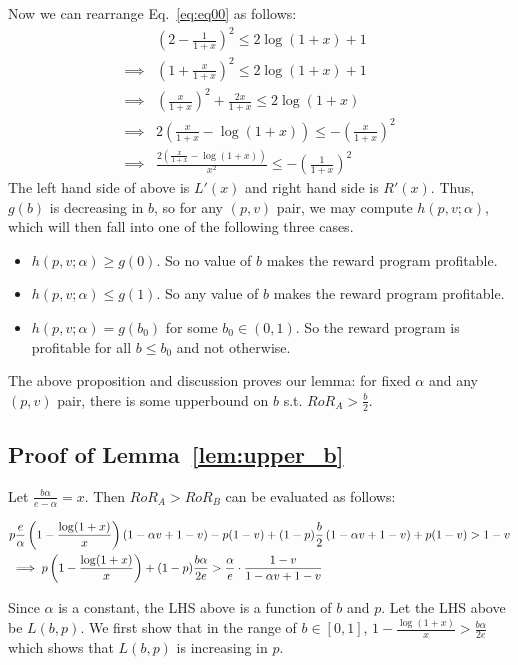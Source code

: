 Now we can rearrange Eq.~\ref{eq:eq00} as follows:
\begin{align*}
& \left(2-\frac{1}{1+x}\right)^2 \le 2\log(1+x) + 1\\
\implies & \left(1 + \frac{x}{1+x}\right)^2 \le 2\log(1+x) + 1\\
\implies & \left(\frac{x}{1+x}\right)^2 + \frac{2x}{1+x} \le 2\log(1+x)\\
\implies & 2\left(\frac{x}{1+x} - \log(1+x)\right) \le - \left(\frac{x}{1+x}\right)^2\\
\implies & \frac{2\left(\frac{x}{1+x} - \log(1+x)\right)}{x^2} \le - \left(\frac{1}{1+x}\right)^2
\end{align*}
The left hand side of above is $L'(x)$ and right hand side is $R'(x)$.
\endproof
Thus, $g(b)$ is decreasing in $b$, so for any $(p,v)$ pair, we may compute $h(p, v; \alpha)$, which will then fall into one of the following three cases.
\begin{itemize}
\item
$h(p,v;\alpha) \geq g(0)$. So no value of $b$ makes the reward program profitable.
\item
$h(p,v;\alpha) \leq g(1)$. So any value of $b$ makes the reward program profitable.
\item
$h(p,v;\alpha) = g(b_0)$ for some $b_0 \in (0,1)$. So the reward program is profitable for all $b \leq b_0$ and not otherwise.
\end{itemize}

The above proposition and discussion proves our lemma: for fixed $\alpha$ and any $(p,v)$ pair, there is some upperbound on $b$ s.t. $RoR_A > \frac{b}{2}$. 
\endproof

\subsection{Proof of Lemma~\ref{lem:upper_b}}
\proof
Let $\frac{b\alpha}{e-\alpha} = x$. Then $RoR_A > RoR_B$ can be evaluated as follows:

\begin{eqnarray}
& p\frac{e}{\alpha}\left(1-\frac{\log(1+x)}{x}\right)(1-\alpha v + 1 - v) - p(1-v) + (1-p)\frac{b}{2}\left(1-\alpha v + 1-v\right) + p(1-v) > 1-v\notag\\
& \implies p\left(1 - \frac{\log(1+x)}{x}\right) + (1-p)\frac{b\alpha}{2e} > \frac{\alpha}{e} \cdot \frac{1-v}{1-\alpha v + 1 - v}\label{eq:ra>rb}
\end{eqnarray}

Since $\alpha$ is a constant, the LHS above is a function of $b$ and $p$. 
Let the LHS above be $L(b,p)$.
We first show that in the range of $b\in [0,1]$, $1 - \frac{\log(1+x)}{x} > \frac{b\alpha}{2e}$ which shows that $L(b,p)$ is increasing in $p$.

